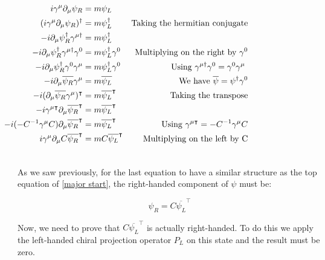 \begin{align}
  &\begin{aligned}
     \mathllap{i \gamma^\mu \partial_\mu \psi_R} &= m\psi_L\\        
     \mathllap{(i \gamma^\mu \partial_\mu \psi_R)^\dagger} &= m\psi_L^\dagger  & \text{Taking the hermitian conjugate} \\
     \mathllap{-i \partial_\mu \psi_R^\dagger \gamma^{\mu \dagger}} &= m \psi_L^\dagger \\
     \mathllap{-i \partial_\mu \psi_R^\dagger \gamma^{\mu \dagger}\gamma^0} &= m \psi_L^\dagger \gamma^0  &\text{Multiplying on the right by $\gamma^0$}\\
     \mathllap{-i \partial_\mu \psi_R^\dagger \gamma^0 \gamma^\mu} &= m \psi_L^\dagger \gamma^0  &\text{Using $\gamma^{\mu \dagger}\gamma^0 = \gamma^0 \gamma^\mu$ }\\    %
     \mathllap{-i \partial_\mu \overline{\psi_R}\gamma^\mu} &= m \overline{\psi_L} &\text{We have $\overline{\psi} = \psi^{\dagger}\gamma^0$}\\
     \mathllap{-i (\partial_\mu \overline{\psi_R}\gamma^\mu)^\intercal} &= m \overline{\psi_L}^\intercal &\text{Taking the transpose}\\
     \mathllap{-i \gamma^{\mu \intercal} \partial_\mu \overline{\psi_R}^\intercal} &= m \overline{\psi_L}^\intercal \\
     \mathllap{-i (-C^{-1}\gamma^\mu C) \partial_\mu \overline{\psi_R}^\intercal} &= m \overline{\psi_L}^\intercal &\text{Using $\gamma^{\mu \intercal}= -C^{-1}\gamma^\mu C$}\\
     \mathllap{i \gamma^\mu \partial_\mu C \overline{\psi_R}^\intercal} &= m C \overline{\psi_L}^\intercal &\text{Multiplying on the left by C}\\
  &\end{aligned}
\end{align}

As we saw previously, for the last equation to have a similar structure as the top equation of \ref{major start}, the right-handed component of $\psi$ must be:

\begin{equation}
 \psi_R = C \overline{\psi_L}^\intercal
\end{equation}

Now, we need to prove that $C \overline{\psi_L}^\intercal$ is actually right-handed. To do this we apply the left-handed chiral projection operator $P_L$ on this state and
the result must be zero.

